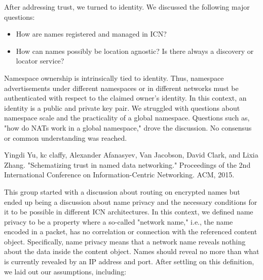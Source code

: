 \documentclass[a4paper,UKenglish]{dagrep}
\begin{document}
After addressing trust, we turned to identity. We discussed the following major questions:
%
\begin{itemize}
\item How are names registered and managed in ICN?
\item How can names possibly be location agnostic? Is there always a discovery or locator service?
\end{itemize}
%
Namespace ownership is intrinsically tied to identity. Thus, namespace advertisements under different namespaces or in different networks must be authenticated with respect to the claimed owner's identity. In this context, an identity is a public and private key pair. We struggled with questions about namespace scale and the practicality of a global namespace. Questions such as, "how do NATs work in a global namespace," drove the discussion. No consensus or common understanding was reached.

\begin{thebibliography}{0}
Yingdi Yu, kc claffy, Alexander Afanasyev, Van Jacobson, David Clark, and Lixia Zhang. "Schematizing trust in named data networking." Proceedings of the 2nd International Conference on Information-Centric Networking. ACM, 2015.
\end{thebibliography}

\license

This group started with a discussion about routing on encrypted names but ended up being a discussion about name privacy and the necessary conditions for it to be possible in different ICN architectures. In this context, we defined name privacy to be a property where a so-called "network name," i.e., the name encoded in a packet, has no correlation or connection with the referenced content object. Specifically, name privacy means that a network name reveals nothing about the data inside the content object. Names should reveal no more than what is currently revealed by an IP address and port. After settling on this definition, we laid out our assumptions, including: 
\end{document}
